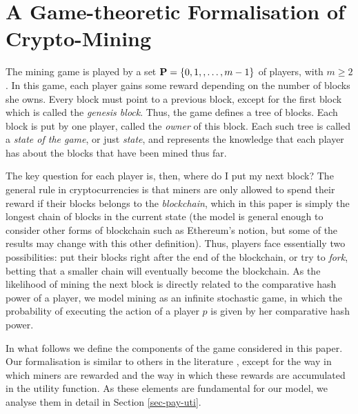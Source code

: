 
\section{A Game-theoretic Formalisation of Crypto-Mining}
\label{sec-formalization}

The mining game is played by a set $\mathbf{P} = \{0, 1, , \ldots, m-1\}$ of players, with $m \geq 2$.
In this game, each player gains some reward depending on the number of blocks she owns. Every block must point to a previous block, except for the first block which is called the {\em genesis block}. Thus, the game defines a tree of blocks. Each block is put by one player, called the {\em owner} of this block. Each such tree is called a {\em state of the game}, or just {\em state}, and represents the knowledge that each player has about the blocks that have been mined thus far.

The key question for each player is, then, where do I put my next block? The general rule in cryptocurrencies is that miners are only allowed to spend their reward if their blocks belongs to the \emph{blockchain}, which in this paper is simply the longest chain of blocks in the current state (the model is general enough to consider other forms of blockchain such as 
Ethereum's notion, but some of the results may change with this other definition). Thus, players face essentially two possibilities: put their blocks right after the end of the blockchain, or try to \emph{fork}, betting that a smaller chain will eventually become the blockchain. As the likelihood of mining the next block is directly related to the comparative hash power of a player, we model mining as an infinite stochastic game, in which the probability of executing the action of a player $p$ is given by her comparative hash power.

In what follows we define the components of the game considered in this paper. Our formalisation is similar to others in the literature \cite{mininggames:2016,koutsoupias2018blockchain}, except for the way in which miners are rewarded and the way in which these rewards are accumulated in the utility function. As these elements are fundamental for our model, we analyse them in detail in Section \ref{sec-pay-uti}.

